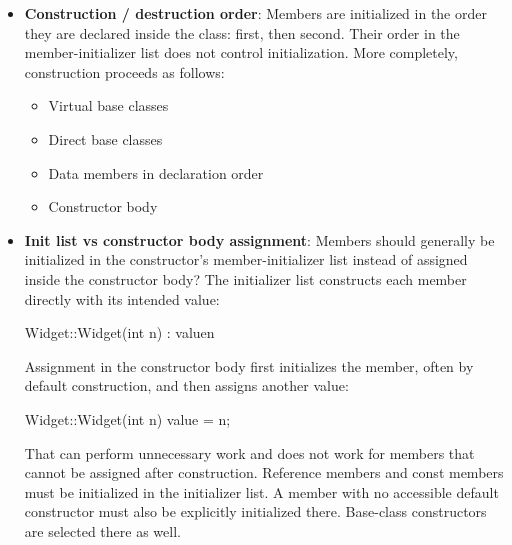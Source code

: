 \documentclass{report}
\begin{document}
\begin{itemize}
\begin{center}
\begin{tabularx}{\textwidth}{@{}XXX@{}}
                    \bottomrule
                \end{tabularx}
            \end{center}
            An object’s lifetime generally begins when suitably aligned storage has been obtained and its initialization is complete. Merely allocating raw bytes does not necessarily create an object in them; a non-implicit-lifetime class may require construction, often through placement new or std::construct\_at.
            \bigbreak \noindent 
            For a class object, its lifetime ends when its destructor begins, not when it finishes. An object’s lifetime can also end when its storage is released or reused by another object.
        \item \textbf{Construction / destruction order}: Members are initialized in the order they are declared inside the class: first, then second. Their order in the member-initializer list does not control initialization.
            \bigbreak \noindent 
            More completely, construction proceeds as follows:
            \begin{itemize}
                \item Virtual base classes
                \item Direct base classes
                \item Data members in declaration order
                \item Constructor body
            \end{itemize}
        \item \textbf{Init list vs constructor body assignment}: Members should generally be initialized in the constructor’s member-initializer list instead of assigned inside the constructor body?
            \bigbreak \noindent 
            The initializer list constructs each member directly with its intended value:
            \bigbreak \noindent 
            \begin{cppcode}
            Widget::Widget(int n) : value{n} {}
            \end{cppcode}
            \bigbreak \noindent 
            Assignment in the constructor body first initializes the member, often by default construction, and then assigns another value:
            \bigbreak \noindent 
            \begin{cppcode}
                Widget::Widget(int n) {
                    value = n;
                }
            \end{cppcode}
            \bigbreak \noindent 
            That can perform unnecessary work and does not work for members that cannot be assigned after construction. Reference members and const members must be initialized in the initializer list. A member with no accessible default constructor must also be explicitly initialized there. Base-class constructors are selected there as well.

\end{itemize}
\end{document}
